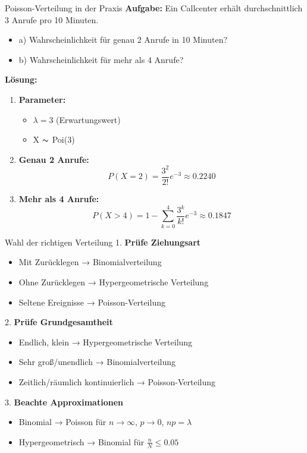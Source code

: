 \begin{example}{Poisson-Verteilung in der Praxis}
\textbf{Aufgabe:} Ein Callcenter erhält durchschnittlich 3 Anrufe pro 10 Minuten.
\begin{itemize}
\item a) Wahrscheinlichkeit für genau 2 Anrufe in 10 Minuten?
\item b) Wahrscheinlichkeit für mehr als 4 Anrufe?
\end{itemize}

\textbf{Lösung:}
\begin{enumerate}
\item \textbf{Parameter:}
   \begin{itemize}
   \item $\lambda = 3$ (Erwartungswert)
   \item X $\thicksim$ Poi(3)
   \end{itemize}

\item \textbf{Genau 2 Anrufe:}
   $$P(X=2) = \frac{3^2}{2!}e^{-3} \approx 0.2240$$

\item \textbf{Mehr als 4 Anrufe:}
   $$P(X>4) = 1 - \sum_{k=0}^4 \frac{3^k}{k!}e^{-3} \approx 0.1847$$
\end{enumerate}
\end{example}

\begin{KR}{Wahl der richtigen Verteilung}
1. \textbf{Prüfe Ziehungsart}
   \begin{itemize}
   \item Mit Zurücklegen → Binomialverteilung
   \item Ohne Zurücklegen → Hypergeometrische Verteilung
   \item Seltene Ereignisse → Poisson-Verteilung
   \end{itemize}

2. \textbf{Prüfe Grundgesamtheit}
   \begin{itemize}
   \item Endlich, klein → Hypergeometrische Verteilung
   \item Sehr groß/unendlich → Binomialverteilung
   \item Zeitlich/räumlich kontinuierlich → Poisson-Verteilung
   \end{itemize}

3. \textbf{Beachte Approximationen}
   \begin{itemize}
   \item Binomial → Poisson für $n \to \infty$, $p \to 0$, $np = \lambda$
   \item Hypergeometrisch → Binomial für $\frac{n}{N} \leq 0.05$
   \end{itemize}
\end{KR}




